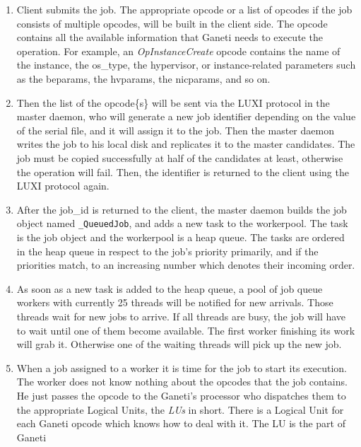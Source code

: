 \begin{enumerate}
  \item Client submits the job. The appropriate opcode or a list of opcodes
        if the job consists of multiple opcodes, will be built in the client
        side. The opcode contains all the available information that Ganeti
        needs to execute the operation. For example, an
        \emph{OpInstanceCreate} opcode contains the name of the instance,
        the os\_type, the hypervisor, or instance-related parameters such as
        the beparams, the hvparams, the nicparams, and so on.
  \item Then the list of the opcode\{s\} will be sent via the LUXI protocol
        in the master daemon, who will generate a new job identifier depending
        on the value of the serial file, and it will assign it to the job.
        Then the master daemon writes the job to his local disk and replicates
        it to the master candidates. The job must be copied successfully at half
        of the candidates at least, otherwise the operation will fail. Then,
        the identifier is returned to the client using the LUXI protocol again.
  \item After the job\_id is returned to the client, the master daemon builds
        the job object named \texttt{\_QueuedJob}, and adds a new task to
        the workerpool. The task is the job object and the workerpool is a
        heap queue. The tasks are ordered in the heap queue in respect to
        the job's priority primarily, and if the priorities match, to an
        increasing number which denotes their incoming order.
  \item As soon as a new task is added to the heap queue, a pool of job queue
        workers with currently 25 threads will be notified for new arrivals.
        Those threads wait for new jobs to arrive. If all threads
        are busy, the job will have to wait until one of them become
        available. The first worker finishing its work will grab it.
        Otherwise one of the waiting threads will pick up the new job.
  \item When a job assigned to a worker it is time for the job to start its
        execution. The worker does not know nothing about the opcodes that
        the job contains. He just passes the opcode to the Ganeti's
        processor who dispatches them to the appropriate Logical Units,
        the \emph{LUs} in short. There is a Logical Unit for each Ganeti
        opcode which knows how to deal with it. The LU is the part of Ganeti

\end{enumerate}
